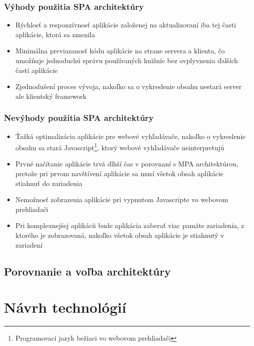 \subsubsection*{Výhody použitia SPA architektúry}

\begin{itemize}
	\item Rýchlosť a responzívnosť aplikácie založenej na aktualizovaní iba tej časti aplikácie, ktorá sa zmenila \cite{spa-vs-mpa-1}
	\item Minimálna previazanosť kódu aplikácie na strane servera a klienta, čo umožňuje jednoduchú správu používaných knižníc bez ovplyvnenia ďalších častí aplikácie \cite{spa-vs-mpa-2}
	\item Zjednodušení proces vývoja, nakoľko sa o vykreslenie obsahu nestará server ale klientský framework \cite{spa-vs-mpa-3}
\end{itemize}


\subsubsection*{Nevýhody použitia SPA architektúry}

\begin{itemize}
	\item Ťažká optimalizácia aplikácie pre webové vyhľadávače, nakoľko o vykreslenie obsahu sa stará Javascript\footnote{Programovací jazyk bežiaci vo webovom prehliadači}, ktorý webové vyhľadávače neinterpretujú \cite{spa-vs-mpa-1}
	\item Prvné načítanie aplikácie trvá dlhší čas v porovnaní s MPA architektúrou, pretože pri prvom navštívení aplikácie sa musí všetok obsah aplikácie stiahnuť do zariadenia
	\item Nemožnosť zobrazenia aplikácie pri vypnutom Javascripte vo webovom prehliadači \cite{spa-vs-mpa-2}
	\item Pri komplexnejšej aplikácii bude aplikácia zaberať viac pamäte zariadenia, z ktorého je zobrazovaná, nakoľko všetok obsah aplikácie je stiahnutý v zariadení \cite{spa-vs-mpa-3}
\end{itemize}



\subsection{Porovnanie a voľba architektúry}





\section{Návrh technológií}


